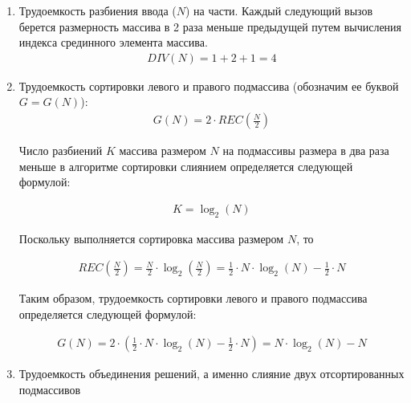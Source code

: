 \begin{enumerate}[label={\arabic*)}]
	\item Трудоемкость разбиения ввода ($N$) на части. Каждый следующий вызов берется размерность массива в 2 раза меньше предыдущей путем вычисления индекса срединного элемента массива.
	\begin{equation}
		\label{eq:div}
		\begin{gathered}
			DIV(N) = 1 + 2 + 1 = 4
		\end{gathered}
	\end{equation}
	\item Трудоемкость сортировки левого и правого подмассива (обозначим ее буквой $G = G(N)$):
	\begin{equation}
		\label{eq:G}
		\begin{gathered}
			G(N) = 2 \cdot REC(\frac{N}{2})
		\end{gathered}
	\end{equation}
	
	Число разбиений $K$ массива размером $N$ на подмассивы размера в два раза меньше в алгоритме сортировки слиянием определяется следующей формулой:
	
	\begin{equation}
		\begin{gathered}
			K = \log_2(N)
		\end{gathered}
	\end{equation}

	Поскольку выполняется сортировка массива размером $N$, то 
	
	\begin{equation}
		\begin{gathered}
			REC(\frac{N}{2}) = \frac{N}{2} \cdot \log_2(\frac{N}{2}) = \frac{1}{2} \cdot N \cdot \log_2(N) - \frac{1}{2} \cdot N
		\end{gathered}
	\end{equation}
	
	Таким образом, трудоемкость сортировки левого и правого подмассива определяется следующей формулой:
	
	\begin{equation}
		\label{eq:Gfinish}
		\begin{gathered}
			G(N) = 2 \cdot (\frac{1}{2} \cdot N \cdot \log_2(N) - \frac{1}{2} \cdot N) = N \cdot \log_2(N) - N
		\end{gathered}
	\end{equation}
	
	\item Трудоемкость объединения решений, а именно слияние двух отсортированных подмассивов
	

\end{enumerate}
